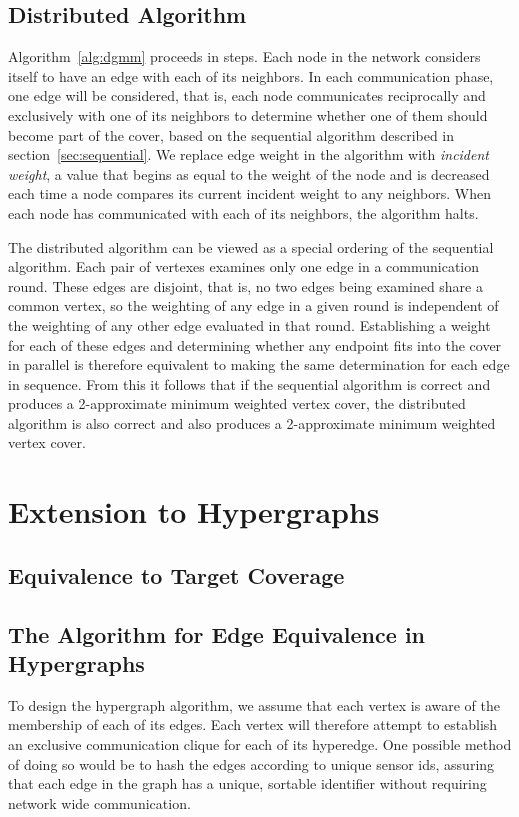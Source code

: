 \subsection{Distributed Algorithm}
\label{sub:alg-dgmm}
Algorithm~\ref{alg:dgmm} proceeds in steps. Each node in the network considers itself to have an edge with each of its neighbors. In each communication phase, one edge will be considered, that is, each node communicates reciprocally and exclusively with one of its neighbors to determine whether one of them should become part of the cover, based on the sequential algorithm described in section~\ref{sec:sequential}. We replace edge weight in the algorithm with {\em incident weight}, a value that begins as equal to the weight of the node and is decreased each time a node compares its current incident weight to any neighbors. When each node has communicated with each of its neighbors, the algorithm halts.



The distributed algorithm can be viewed as a special ordering of the sequential algorithm. Each pair of vertexes examines only one edge in a communication round. These edges are disjoint, that is, no two edges being examined share a common vertex, so the weighting of any edge in a given round is independent of the weighting of any other edge evaluated in that round. Establishing a weight for each of these edges and determining whether any endpoint fits into the cover in parallel is therefore equivalent to making the same determination for each edge in sequence. From this it follows that if the sequential algorithm is correct and produces a 2-approximate minimum weighted vertex cover, the distributed algorithm is also correct and also produces a 2-approximate minimum weighted vertex cover.   

\section{Extension to Hypergraphs}
\subsection{Equivalence to Target Coverage}

\subsection{The Algorithm for Edge Equivalence in Hypergraphs}
To design the hypergraph algorithm, we assume that each vertex is aware of the membership of each of its edges. Each vertex will therefore attempt to establish an exclusive communication clique for each of its hyperedge. One possible method of doing so would be to hash the edges according to unique sensor ids, assuring that each edge in the graph has a unique, sortable identifier without requiring network wide communication.

